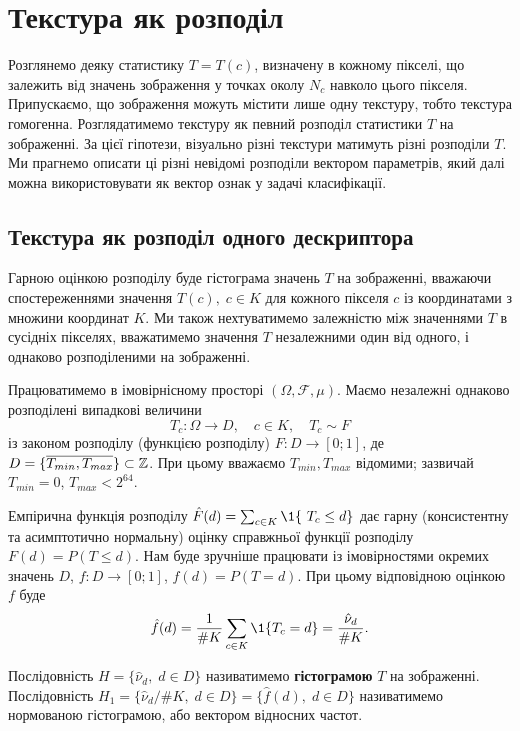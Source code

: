 
\section{Текстура як розподіл}\label{section1.2}\hfill

Розглянемо деяку статистику $T = T(c)$, визначену в кожному пікселі, що залежить від значень зображення у точках околу $N_c$ навколо цього пікселя.
Припускаємо, що зображення можуть містити лише одну текстуру, тобто текстура гомогенна.
Розглядатимемо текстуру як певний розподіл статистики $T$ на зображенні. 
За цієї гіпотези, візуально різні текстури матимуть різні розподіли $T$.
Ми прагнемо описати ці різні невідомі розподіли вектором параметрів, який далі можна використовувати як вектор ознак у задачі класифікації.

\subsection{Текстура як розподіл одного дескриптора}\label{section1.2a}\hfill

Гарною оцінкою розподілу буде гістограма значень $T$ на зображенні, вважаючи спостереженнями значення $T(c), \; c \in K$ для кожного пікселя $c$ із координатами з множини координат $K$.
Ми також нехтуватимемо залежністю між значеннями $T$ в сусідніх пікселях, вважатимемо значення $T$ незалежними один від одного, і однаково розподіленими на зображенні.

Працюватимемо в імовірнісному просторі $(\Omega, \mathcal F, \mu)$.
Маємо незалежні однаково розподілені випадкові величини 
\[ T_c \colon \Omega \to D, \quad c \in K, \quad T_c \sim F \] 
із законом розподілу (функцією розподілу) $F \colon D \to [0;1]$, де $D = \{\overline{T_{min}, T_{max}}\} \subset \mathbb Z$.
При цьому вважаємо $T_{min}, T_{max}$ відомими; зазвичай $T_{min} = 0$, $T_{max} < 2^{64}$.

Емпірична функція розподілу $\hat F(d) = \sum_{c\in K} \1\{\ T_c \le d \}$
дає гарну (консистентну та асимптотично нормальну) оцінку справжньої функції розподілу $F(d) = P(T \le d)$.
Нам буде зручніше працювати із імовірностями окремих значень $D$, $f \colon D \to [0;1]$, $f(d) = P(T = d)$.
При цьому відповідною оцінкою $f$ буде 
\[\hat f(d) = \frac{1}{\# K}\sum_{c\in K}\1\{T_c = d\} = \frac{\hat\nu_d}{\# K}.\]

Послідовність $H = \{ \hat \nu_d, \; d\in D \}$ називатимемо \textbf{гістограмою} $T$ на зображенні.
Послідовність $H_1 = \{ \hat \nu_d / \# K, \; d\in D \} = \{\hat f(d), \; d\in D\}$ називатимемо нормованою гістограмою, або вектором відносних частот.

